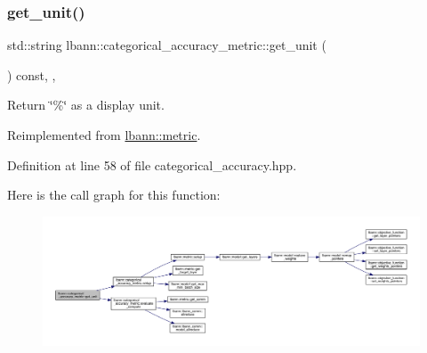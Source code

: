 \mbox{\label{classlbann_1_1categorical__accuracy__metric_a9c06851bc233a01b28c346a10d278d99}} 
\subsubsection{\texorpdfstring{get\+\_\+unit()}{get\_unit()}}
{\footnotesize\ttfamily std\+::string lbann\+::categorical\+\_\+accuracy\+\_\+metric\+::get\+\_\+unit (\begin{DoxyParamCaption}{ }\end{DoxyParamCaption}) const\hspace{0.3cm}{\ttfamily [inline]}, {\ttfamily [override]}, {\ttfamily [virtual]}}

Return \char`\"{}\%\char`\"{} as a display unit. 

Reimplemented from \hyperlink{classlbann_1_1metric_a13fd302dec85190b877f7146529e516c}{lbann\+::metric}.



Definition at line 58 of file categorical\+\_\+accuracy.\+hpp.


Here is the call graph for this function\+:\nopagebreak
\begin{figure}[H]
\begin{center}
\leavevmode
\includegraphics[width=350pt]{classlbann_1_1categorical__accuracy__metric_a9c06851bc233a01b28c346a10d278d99_cgraph}
\end{center}
\end{figure}
\mbox{\label{classlbann_1_1categorical__accuracy__metric_a6fea8e495ab4ec4b05546c794468fa12}} 
